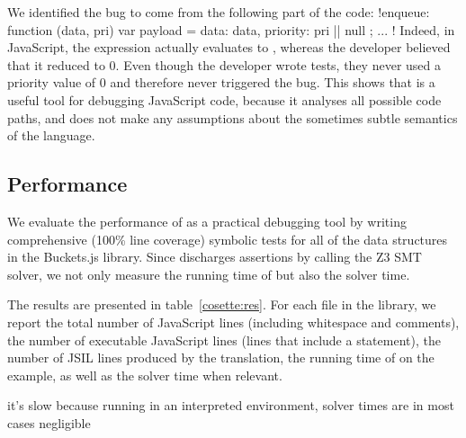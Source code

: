 We identified the bug to come from the following part of the code: \jsinline!enqueue: function (data, pri) {var payload = { data: data, priority: pri || null }; ... }!
Indeed, in JavaScript, the expression  actually evaluates to , whereas the developer believed that it reduced to 0.
Even though the developer wrote tests, they never used a priority value of 0 and therefore never triggered the bug.
This shows that \cosette is a useful tool for debugging JavaScript code, because it analyses all possible code paths, and does not make any assumptions about the sometimes subtle semantics of the language.

\subsection{Performance}

We evaluate the performance of \cosette as a practical debugging tool by writing comprehensive (100\% line coverage) symbolic tests for all of the data structures in the Buckets.js library.
Since \cosette discharges assertions by calling the Z3 SMT solver, we not only measure the running time of \cosette but also the solver time.

The results are presented in table~\ref{cosette:res}.
For each file in the library, we report the total number of JavaScript lines (including whitespace and comments), the number of executable JavaScript lines (lines that include a statement), the number of JSIL lines produced by the translation, the running time of \cosette on the example, as well as the solver time when relevant.

it's slow because running in an interpreted environment, solver times are in most cases 
negligible


